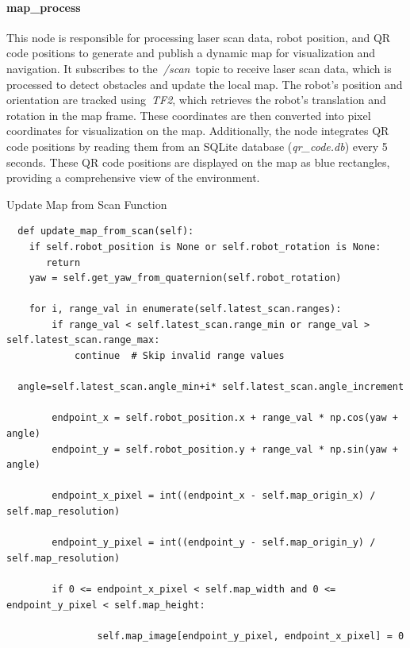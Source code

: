 \documentclass[../../main]{subfiles}
\begin{document}
\paragraph{map\_process}

This node is responsible for processing laser scan data, robot position,
and QR code positions to generate and publish a dynamic map for
visualization and navigation. It subscribes to the~\emph{/scan}~topic to
receive laser scan data, which is processed to detect obstacles and
update the local map. The robot's position and orientation are tracked
using~\emph{TF2}, which retrieves the robot's translation and rotation
in the map frame. These coordinates are then converted into pixel
coordinates for visualization on the map. Additionally, the node
integrates QR code positions by reading them from an SQLite database
(\emph{qr\_code.db}) every 5 seconds. These QR code positions are
displayed on the map as blue rectangles, providing a comprehensive view
of the environment.

\begin{codebox}[]{Update Map from Scan Function}
  \begin{verbatim}
  def update_map_from_scan(self):
    if self.robot_position is None or self.robot_rotation is None:
       return
    yaw = self.get_yaw_from_quaternion(self.robot_rotation)

    for i, range_val in enumerate(self.latest_scan.ranges):
        if range_val < self.latest_scan.range_min or range_val > self.latest_scan.range_max:
            continue  # Skip invalid range values
            
  angle=self.latest_scan.angle_min+i* self.latest_scan.angle_increment

        endpoint_x = self.robot_position.x + range_val * np.cos(yaw + angle)
        endpoint_y = self.robot_position.y + range_val * np.sin(yaw + angle)

        endpoint_x_pixel = int((endpoint_x - self.map_origin_x) / self.map_resolution)

        endpoint_y_pixel = int((endpoint_y - self.map_origin_y) / self.map_resolution)
            
        if 0 <= endpoint_x_pixel < self.map_width and 0 <= endpoint_y_pixel < self.map_height:
                
                self.map_image[endpoint_y_pixel, endpoint_x_pixel] = 0

\end{verbatim}
\end{codebox}
\end{document}
